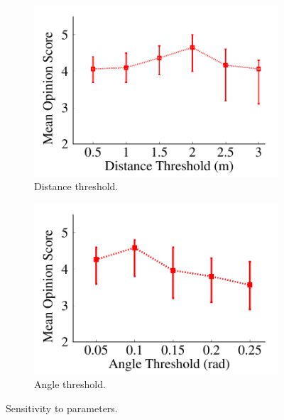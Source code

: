 \begin{figure}[t]
\centering
  \begin{subfigure}[t]{0.5\textwidth}
    \includegraphics[width=\linewidth]{Figs/RTDrive/evaluation/context_dist.pdf}
    \vspace{-0.5cm}
    \caption{Distance threshold.}
    \label{param_dist}
  \end{subfigure}%
  \begin{subfigure}[t]{0.5\textwidth}
    \includegraphics[width=\linewidth]{Figs/RTDrive/evaluation/context_gyro.pdf}
    \vspace{-0.5cm}
    \caption{Angle threshold.}
    \label{param_angle}
  \end{subfigure}%
  \vspace{-0.2cm}
  \caption{Sensitivity to parameters. }
  \label{parameters}
  \vspace{-0.25cm}
\centering
\end{figure}


